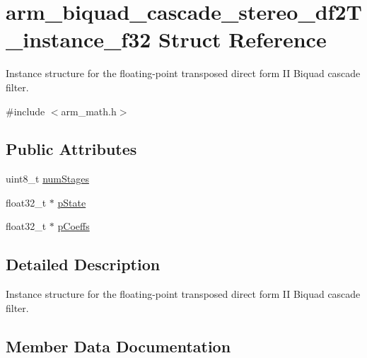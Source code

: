 \hypertarget{structarm__biquad__cascade__stereo__df2_t__instance__f32}{}\section{arm\+\_\+biquad\+\_\+cascade\+\_\+stereo\+\_\+df2\+T\+\_\+instance\+\_\+f32 Struct Reference}
\label{structarm__biquad__cascade__stereo__df2_t__instance__f32}


Instance structure for the floating-\/point transposed direct form II Biquad cascade filter.  




{\ttfamily \#include $<$arm\+\_\+math.\+h$>$}

\subsection*{Public Attributes}
\begin{DoxyCompactItemize}
\item 
uint8\+\_\+t \hyperlink{structarm__biquad__cascade__stereo__df2_t__instance__f32_a5655328252da5c2c2425ceed253bc4f1}{num\+Stages}
\item 
float32\+\_\+t $\ast$ \hyperlink{structarm__biquad__cascade__stereo__df2_t__instance__f32_a2cb00048bb1fe957a03c1ff56dfaf8f0}{p\+State}
\item 
float32\+\_\+t $\ast$ \hyperlink{structarm__biquad__cascade__stereo__df2_t__instance__f32_a58b15644de62a632c5e9d4a563569dc6}{p\+Coeffs}
\end{DoxyCompactItemize}


\subsection{Detailed Description}
Instance structure for the floating-\/point transposed direct form II Biquad cascade filter. 

\subsection{Member Data Documentation}
